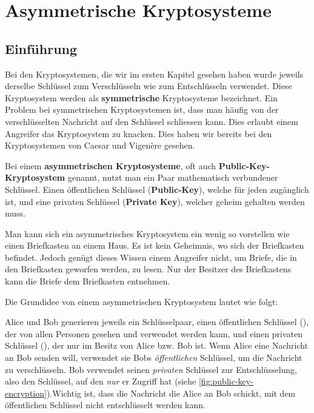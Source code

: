 

\chapter{Asymmetrische Kryptosysteme}\label{ch:03}

\lstset{style=Python}

\section{Einführung}\label{sec:asymmetrischeKryptosysteme}

	Bei den Kryptosystemen, die wir im ersten Kapitel gesehen haben wurde jeweils derselbe Schlüssel zum Verschlüsseln wie zum Entschlüsseln verwendet. Diese Kryptosystem werden als \textbf{symmetrische} Kryptosysteme bezeichnet. Ein Problem bei symmetrischen Kryptosystemen ist, dass man häufig von der verschlüsselten Nachricht auf den Schlüssel schliessen kann. Dies erlaubt einem Angreifer das Kryptosystem zu knacken. Dies haben wir bereits bei den Kryptosystemen von Caesar und Vigenère gesehen.

	Bei einem \textbf{asymmetrischen Kryptosysteme}, oft auch \textbf{Public-Key-Kryptosystem} genannt, nutzt man ein Paar mathematisch verbundener Schlüssel. Einen öffentlichen Schlüssel (\textbf{Public-Key}), welche für jeden zugänglich ist, und eine privaten Schlüssel (\textbf{Private Key}), welcher geheim gehalten werden muss. 

	Man kann sich ein asymmetrisches Kryptosystem ein wenig so vorstellen wie einen Briefkasten an einem Haus. Es ist kein Geheimnis, wo sich der Briefkasten befindet. Jedoch genügt dieses Wissen einem Angreifer nicht, um Briefe, die in den Briefkasten geworfen werden, zu lesen. Nur der Besitzer des Briefkastens kann die Briefe dem Briefkasten entnehmen.

	Die Grundidee von einem asymmetrischen Kryptosystem lautet wie folgt:

	Alice und Bob generieren jeweils ein Schlüsselpaar, einen  öffentlichen Schlüssel (), der von allen Personen gesehen und verwendet werden kann, und einen privaten Schlüssel (), der nur im Besitz von Alice bzw. Bob ist. Wenn Alice eine Nachricht an Bob senden will, verwendet sie Bobs \textit{öffentlichen} Schlüssel, um die Nachricht zu verschlüsseln. Bob verwendet seinen \textit{privaten} Schlüssel zur Entschlüsselung, also den Schlüssel, auf den \textit{nur} er Zugriff hat (siehe \ref{fig:public-key-encryption}).Wichtig ist, dass die Nachricht die Alice an Bob schickt, mit dem öffentlichen Schlüssel nicht entschlüsselt werden kann. 

